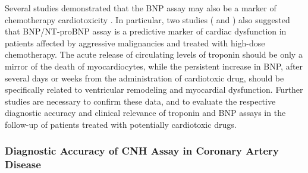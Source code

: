 \documentclass[14pt,a4paper,onecolumn]{extarticle}
\begin{document}

Several studies demonstrated that the BNP assay may also be a marker of chemotherapy cardiotoxicity \citep{bib3148} \citep{bib3149} \citep{bib3150} \citep{bib3151} \citep{bib3152}. In particular,
two  studies (\citep{bib3161} and \citep{bib3162}) also suggested that BNP/NT-proBNP assay is a predictive marker of cardiac dysfunction in patients affected by aggressive malignancies and treated with high-dose chemotherapy. The acute release of circulating levels of troponin should be only a mirror of the death of myocardiocytes, while the persistent increase in BNP, after several days or weeks from the administration of cardiotoxic drug, should be specifically related to ventricular remodeling and myocardial dysfunction. Further studies are necessary to confirm these data, and to evaluate the respective diagnostic accuracy and clinical relevance of troponin and BNP assays in the follow-up of patients treated with potentially cardiotoxic drugs.

\subsubsection{ Diagnostic Accuracy of CNH Assay in Coronary Artery Disease}
\end{document}
